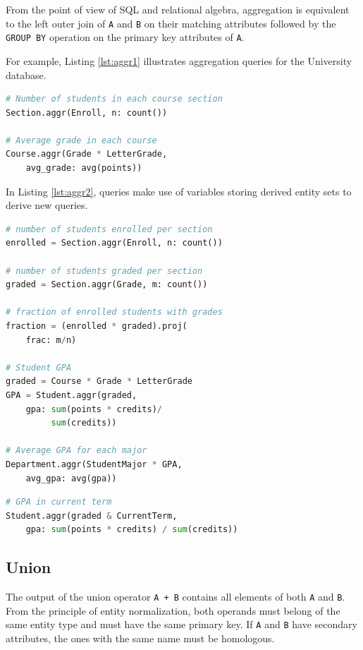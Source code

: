 \documentclass[letter,10pt]{article}
\begin{document}
From the point of view of SQL and relational algebra, aggregation is equivalent to the left outer join of \lstinline$A$ and \lstinline$B$ on their matching attributes followed by the \lstinline$GROUP BY$ operation on the primary key attributes of \lstinline$A$.

For example, Listing \ref{lst:aggr1} illustrates aggregation queries for the University database.
\begin{lstlisting}[language=Python, caption={Calculate summary statistics.}, label={lst:aggr1}]
# Number of students in each course section
Section.aggr(Enroll, n: count())

# Average grade in each course
Course.aggr(Grade * LetterGrade, 
    avg_grade: avg(points))
\end{lstlisting}

In Listing \ref{lst:aggr2}, queries make use of variables storing derived entity sets to derive new queries.
\begin{lstlisting}[language=Python, caption={Calculate summary statistics.}, label={lst:aggr2}]
# number of students enrolled per section
enrolled = Section.aggr(Enroll, n: count())

# number of students graded per section
graded = Section.aggr(Grade, m: count())

# fraction of enrolled students with grades
fraction = (enrolled * graded).proj(
    frac: m/n)

# Student GPA
graded = Course * Grade * LetterGrade
GPA = Student.aggr(graded,
    gpa: sum(points * credits)/
         sum(credits))

# Average GPA for each major
Department.aggr(StudentMajor * GPA, 
    avg_gpa: avg(gpa))
\end{lstlisting}

\begin{lstlisting}[language=Python, caption={Reuse of variables}, label={lst:aggr3}]
# GPA in current term
Student.aggr(graded & CurrentTerm, 
    gpa: sum(points * credits) / sum(credits))
\end{lstlisting}

\subsection{Union}\label{sec:union}
The output of the union operator \lstinline$A + B$ contains all elements of both \lstinline$A$ and \lstinline$B$.  
From the principle of entity normalization, both operands must belong of the same entity type and must have the same primary key.
If \lstinline$A$ and \lstinline$B$ have secondary attributes, the ones with the same name must be homologous.
\end{document}

